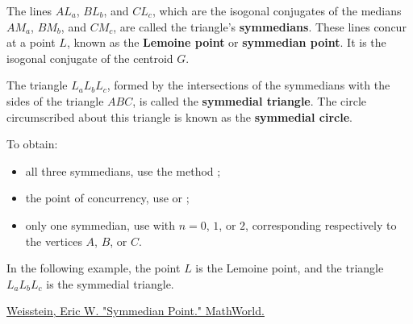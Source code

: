 The lines $AL_a$, $BL_b$, and $CL_c$, which are the isogonal conjugates of the medians $AM_a$, $BM_b$, and $CM_c$, are called the triangle’s \textbf{symmedians}. These lines concur at a point $L$, known as the \textbf{Lemoine point} or \textbf{symmedian point}. It is the isogonal conjugate of the centroid $G$.

\medskip

The triangle $L_aL_bL_c$, formed by the intersections of the symmedians with the sides of the triangle $ABC$, is called the \textbf{symmedial triangle}. The circle circumscribed about this triangle is known as the \textbf{symmedial circle}.

\medskip

To obtain:
\begin{itemize}
  \item all three symmedians, use the method ;
  \item the point of concurrency, use  or ;
  \item only one symmedian, use  with \(n=0\), \(1\), or \(2\), corresponding respectively to the vertices $A$, $B$, or $C$.
\end{itemize}

\medskip

In the following example, the point $L$ is the Lemoine point, and the triangle $L_aL_bL_c$ is the symmedial triangle.
\begin{flushright}
\small
\href{https://mathworld.wolfram.com/SymmedianPoint.html}{Weisstein, Eric W. "Symmedian Point." MathWorld.}
\end{flushright}

\vspace{1em}

